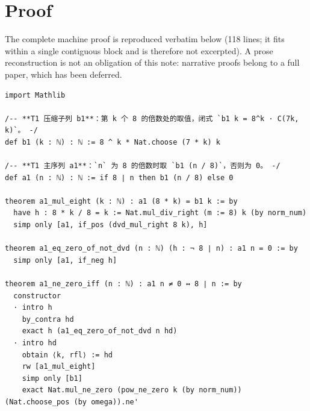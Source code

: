 \documentclass[11pt]{article}
\begin{document}
\section{Proof}
The complete machine proof is reproduced verbatim below (118 lines; it fits within a single
contiguous block and is therefore not excerpted). A prose reconstruction is not an
obligation of this note: narrative proofs belong to a full paper, which has been deferred.

\begin{lstlisting}[caption={Complete proof, verbatim from \texttt{final/01-half3-proved.lean} (118 lines, sha256 \texttt{69375553}...).},label={lst:proof}]
import Mathlib

/-- **T1 压缩子列 b1**：第 k 个 8 的倍数处的取值，闭式 `b1 k = 8^k · C(7k, k)`。 -/
def b1 (k : ℕ) : ℕ := 8 ^ k * Nat.choose (7 * k) k

/-- **T1 主序列 a1**：`n` 为 8 的倍数时取 `b1 (n / 8)`，否则为 0。 -/
def a1 (n : ℕ) : ℕ := if 8 ∣ n then b1 (n / 8) else 0

theorem a1_mul_eight (k : ℕ) : a1 (8 * k) = b1 k := by
  have h : 8 * k / 8 = k := Nat.mul_div_right (m := 8) k (by norm_num)
  simp only [a1, if_pos (dvd_mul_right 8 k), h]

theorem a1_eq_zero_of_not_dvd (n : ℕ) (h : ¬ 8 ∣ n) : a1 n = 0 := by
  simp only [a1, if_neg h]

theorem a1_ne_zero_iff (n : ℕ) : a1 n ≠ 0 ↔ 8 ∣ n := by
  constructor
  · intro h
    by_contra hd
    exact h (a1_eq_zero_of_not_dvd n hd)
  · intro hd
    obtain ⟨k, rfl⟩ := hd
    rw [a1_mul_eight]
    simp only [b1]
    exact Nat.mul_ne_zero (pow_ne_zero k (by norm_num)) (Nat.choose_pos (by omega)).ne'


\end{lstlisting}
\end{document}
